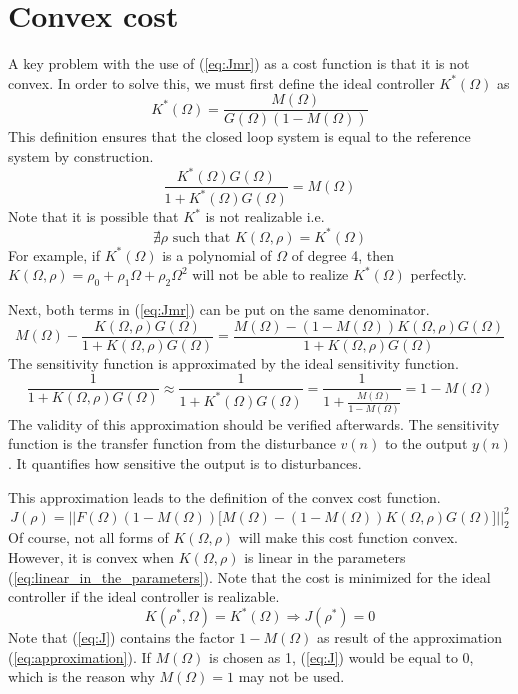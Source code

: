  \section{Convex cost}
A key problem with the use of (\ref{eq:Jmr}) as a cost function is that it is not convex.
In order to solve this, we must first define the ideal controller $K^*(\Omega)$ as
\begin{equation}
    K^*(\Omega) = \frac{M(\Omega)}{G(\Omega)(1-M(\Omega))}
    \label{eq:Kstar_def}
\end{equation}
This definition ensures that the closed loop system is equal to the reference system by construction.
\begin{equation*}
    \frac{K^*(\Omega) G(\Omega)}{1 + K^*(\Omega) G(\Omega)} = M(\Omega)
\end{equation*}
Note that it is possible that $K^*$ is not realizable i.e. 
\begin{equation*}
    \nexists \rho \text{ such that } K(\Omega,\rho) = K^*(\Omega)
\end{equation*}
For example, if $K^*(\Omega)$ is a polynomial of $\Omega$ of degree 4, then $K(\Omega,\rho) = \rho_0 + \rho_1\Omega + \rho_2\Omega^2$ will not be able to realize $K^*(\Omega)$ perfectly.

Next, both terms in (\ref{eq:Jmr}) can be put on the same denominator.
\begin{equation*}
    M(\Omega)-\frac{K(\Omega,\rho) G(\Omega)}{1 + K(\Omega,\rho) G(\Omega)} = \frac{M(\Omega)-(1-M(\Omega))K(\Omega,\rho) G(\Omega)}{1 + K(\Omega,\rho) G(\Omega)}
\end{equation*}
The sensitivity function is approximated by the ideal sensitivity function.
\begin{equation}
    \frac{1}{1 + K(\Omega,\rho) G(\Omega)} \approx \frac{1}{1 + K^*(\Omega) G(\Omega)} = \frac{1}{1+\frac{M(\Omega)}{1-M(\Omega)}} = 1-M(\Omega)
    \label{eq:approximation}
\end{equation}
The validity of this approximation should be verified afterwards. The sensitivity function is the transfer function from the disturbance $v(n)$ to the output $y(n)$. It quantifies how sensitive the output is to disturbances.

This approximation leads to the definition of the convex cost function.
\begin{equation}
\boxed{
    J(\rho) =  \Big|\Big|F(\Omega)(1-M(\Omega)) \Big[M(\Omega)-(1-M(\Omega))K(\Omega,\rho) G(\Omega)\Big]  \Big|\Big|_2^2 
    \label{eq:J}
}
\end{equation}
Of course, not all forms of $K(\Omega,\rho)$ will make this cost function convex. However, it is convex when $K(\Omega,\rho)$ is linear in the parameters (\ref{eq:linear_in_the_parameters}). Note that the cost is minimized for the ideal controller if the ideal controller is realizable.
\begin{equation*}
    K(\rho^*,\Omega) = K^*(\Omega) \Longrightarrow J(\rho^*) = 0
\end{equation*}
Note that (\ref{eq:J}) contains the factor $1-M(\Omega)$ as result of the approximation (\ref{eq:approximation}). If $M(\Omega)$ is chosen as 1, (\ref{eq:J}) would be equal to 0, which is the reason why $M(\Omega) = 1$ may not be used.
